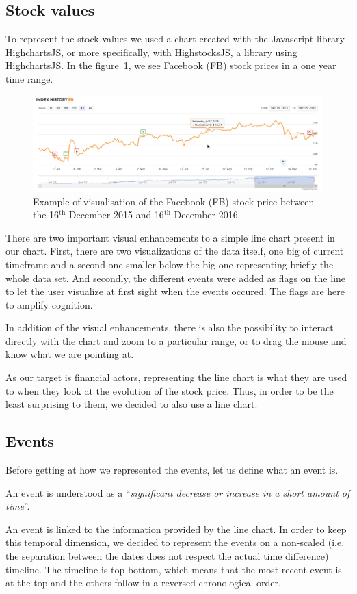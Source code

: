 \subsection{Stock values}
To represent the stock values we used a chart created with the Javascript library HighchartsJS, or more specifically, with HighstocksJS, a library using HighchartsJS. In the figure~\ref{fig:stockchart}, we see Facebook (FB) stock prices in a one year time range.
\begin{figure}
    \centering
    \includegraphics[max width=\textwidth]{Figures/st-chart-pointer.png}
    \caption{Example of visualisation of the Facebook (FB) stock price between the 16$^{\text{th}}$ December 2015 and 16$^{\text{th}}$ December 2016.}
    \label{fig:stockchart}
\end{figure}
There are two important visual enhancements to a simple line chart present in our chart. First, there are two visualizations of the data itself, one big of current timeframe and a second one smaller below the big one representing briefly the whole data set. And secondly, the different events were added as flags on the line to let the user visualize at first sight when the events occured. The flags are here to amplify cognition.

In addition of the visual enhancements, there is also the possibility to interact directly with the chart and zoom to a particular range, or to drag the mouse and know what we are pointing at.

As our target is financial actors, representing the line chart is what they are used to when they look at the evolution of the stock price. Thus, in order to be the least surprising to them, we decided to also use a line chart.

\subsection{Events}
Before getting at how we represented the events, let us define what an event is.
\begin{center}
    An event is understood as a ``\textit{significant decrease or increase in a short amount of time}''.
\end{center}
An event is linked to the information provided by the line chart. In order to keep this temporal dimension, we decided to represent the events on a non-scaled (i.e. the separation between the dates does not respect the actual time difference) timeline. The timeline is top-bottom, which means that the most recent event is at the top and the others follow in a reversed chronological order.

